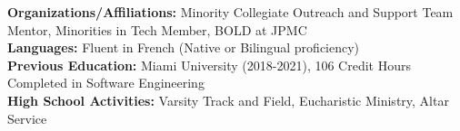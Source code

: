 \documentclass[letterpaper]{article}
\begin{document}
\vspace{1mm}

    \textbf{Organizations/Affiliations:} Minority Collegiate Outreach and Support Team Mentor, Minorities in Tech Member, BOLD at JPMC \\
    \textbf{Languages:} Fluent in French (Native or Bilingual proficiency) \\
    \textbf{Previous Education:} Miami University (2018-2021), 106 Credit Hours Completed in Software Engineering \\
    \textbf{High School Activities:} Varsity Track and Field, Eucharistic Ministry, Altar Service \\
\vspace{2mm}
\end{document}
